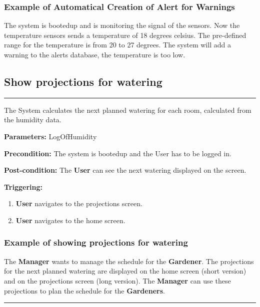 \subsubsection{Example of Automatical Creation of Alert for Warnings}
The system is bootedup and is monitoring the signal of the sensors.
Now the temperature sensors sends a temperature of 18 degrees celsius. The
pre-defined range for the temperature is from 20 to 27 degrees. The system will
add a warning to the alerts database, the temperature is too low.


\subsection{Show projections for watering}
\hrule
\hfill
\vspace{0.5cm}
\label{operation:Show projections for watering}

The System calculates the next planned watering for each room, calculated from the humidity data.

\begin{description}

\item \textbf{Parameters:} LogOfHumidity
\item \textbf{Precondition:} The system is bootedup and the User has to be
logged in.
\item \textbf{Post-condition:} The \textbf{User} can see the next watering displayed on the screen.
\item \textbf{Triggering:}
\begin{enumerate}

\item \textbf{User} navigates to the projections screen.
\item \textbf{User} navigates to the home screen.

\end{enumerate}
\end{description}

\subsubsection{Example of showing projections for watering}
The \textbf{Manager} wants to manage the schedule for the \textbf{Gardener}. The projections for the next planned watering are displayed on the home screen (short version) 
and on the projections screen (long version). The \textbf{Manager} can use these projections to plan the schedule for the \textbf{Gardeners}.
\hfill
\vspace{0.5cm}
\hrule




